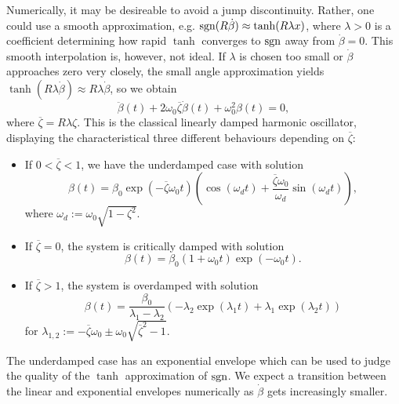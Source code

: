 Numerically, it may be desireable to avoid a jump discontinuity. Rather, one could use a smooth approximation, e.g. $\operatorname{sgn}(R\dot{\beta}) \approx \tanh(R \lambda x)$, where $\lambda >0$ is a coefficient determining how rapid $\tanh$ converges to $\operatorname{sgn}$ away from $\dot{\beta}=0$. This smooth interpolation is, however, not ideal. If $\lambda$ is chosen too small or $\dot{\beta}$ approaches zero very closely, the small angle approximation yields $\tanh(R \lambda \dot{\beta}) \approx R \lambda \dot{\beta}$, so we obtain \[
    \ddot{\beta}(t) + 2 \omega_0 \overline{\zeta} \dot{\beta}(t)+ \omega_0^2 \beta(t)  =0
,\] where $\overline{\zeta} = R \lambda \zeta$. This is the classical linearly damped harmonic oscillator, displaying the characteristical three different behaviours depending on $\overline{\zeta}$:
\begin{itemize}
    \item If $0<\overline{\zeta} < 1$, we have the underdamped case with solution 
        \begin{equation}
            \beta(t)=\beta_0 \exp(-\overline{\zeta} \omega_0 t) \left( \cos(\omega_d t) + \frac{\overline{\zeta} \omega_0}{\omega_d} \sin(\omega_d t) \right),
        \end{equation} where $\omega_d:=\omega_0 \sqrt{1-\zeta^2}$.
    \item If $\overline{\zeta} =0$, the system is critically damped with solution 
        \begin{equation}
            \beta(t) = \beta_0 (1+\omega_0 t) \exp(-\omega_0t).
        \end{equation}
    \item If $\overline{\zeta} >1$, the system is overdamped with solution 
        \begin{equation}
            \beta(t)= \frac{\beta_0}{\lambda_1 - \lambda_2} (-\lambda_2 \exp(\lambda_1 t) + \lambda_1 \exp(\lambda_2 t))
        \end{equation} for $\lambda_{1,2}:=-\overline{\zeta} \omega_0 \pm \omega_0 \sqrt{\overline{\zeta}^2-1}$.
\end{itemize}
The underdamped case has an exponential envelope which can be used to judge the quality of the $\tanh$ approximation of $\operatorname{sgn}$. We expect a transition between the linear and exponential envelopes numerically as $\dot{\beta}$ gets increasingly smaller.
